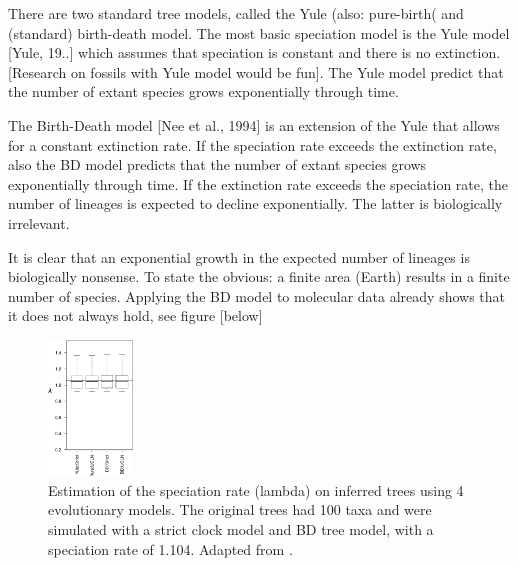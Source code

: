 There are two standard tree models, called the Yule (also: pure-birth(
and (standard) birth-death model. The most basic speciation model
is the Yule model [Yule, 19..] which assumes that speciation
is constant and there is no extinction.
[Research on fossils with Yule model would be fun].
The Yule model predict that the number of extant species
grows exponentially through time.

%

The Birth-Death model [Nee et al., 1994] is an extension of the
Yule that allows for a constant extinction rate. 
If the speciation rate exceeds the extinction rate,
also the BD model predicts that the number of extant species
grows exponentially through time. If the extinction rate exceeds
the speciation rate, the number of lineages is expected to decline
exponentially. The latter is biologically irrelevant.

%

It is clear that an exponential growth in the expected number of lineages
is biologically nonsense. 
To state the obvious: a finite area (Earth) results in a finite number of species. 
Applying the BD model to molecular data already shows that it does not
always hold, see figure [below]

%
%
%
%
%

\begin{figure}[H]
  \includegraphics[width=0.2\textwidth]{sarver2019choice_top_4_bars.png}
  \caption{
    Estimation of the speciation rate (lambda)
    on inferred trees using 4 evolutionary models.
    The original trees had 100 taxa and were simulated with a strict clock model 
    and BD tree model, with a speciation rate of 1.104.
    Adapted from \cite{sarver2019choice}.
 }
  \label{fig:sarver2019choice}
\end{figure}

